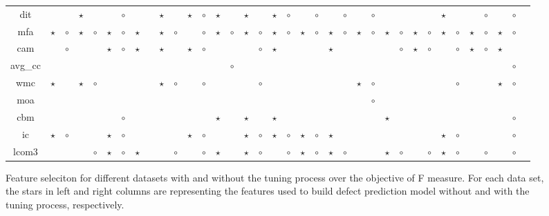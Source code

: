 \documentclass{sig-alternative}
\begin{document}
\begin{figure}[!ht]
\begin{tabular}{c|c c|c c|c c|c c|c c|c c|c c|c c|c c|c c|c c|c c|c c|c c|c c|c c|c c|c }
dit& & & $\star$& & & $\circ$& & & $\star$& & $\star$& $\circ$& $\star$& & $\star$& & $\star$& $\circ$& & $\circ$& & $\circ$& & $\circ$& & & & & $\star$& & & $\circ$& & $\circ$\\
mfa& $\star$& $\circ$& $\star$& $\circ$& $\star$& $\circ$& $\star$& & $\star$& $\circ$& & $\circ$& $\star$& $\circ$& $\star$& $\circ$& $\star$& $\circ$& $\star$& $\circ$& $\star$& $\circ$& $\star$& $\circ$& $\star$& $\circ$& $\star$& $\circ$& $\star$& $\circ$& $\star$& $\circ$& $\star$& $\circ$\\
cam& & $\circ$& & & $\star$& $\circ$& $\star$& & $\star$& & $\star$& $\circ$& & & & $\circ$& $\star$& & & & $\star$& & & & & $\circ$& $\star$& $\circ$& & $\circ$& $\star$& $\circ$& $\star$& \\
avg\_cc& & & & & & & & & & & & & & $\circ$& & & & & & & & & & & & & & & & & & & & $\circ$\\
wmc& $\star$& & $\star$& $\circ$& & & & & $\star$& $\circ$& & $\circ$& & & & $\circ$& & & & & & & $\star$& $\circ$& & & & & & $\circ$& & & $\star$& $\circ$\\
moa& & & & & & & & & & & & & & & & & & & & & & & & $\circ$& & & & & & & & & & \\
cbm& & & & & & $\circ$& & & & & & & $\star$& & $\star$& & $\star$& & & & & & & & $\star$& & & & & & & & & $\circ$\\
ic& $\star$& $\circ$& & & $\star$& $\circ$& & & & & $\star$& $\circ$& & & $\star$& $\circ$& $\star$& $\circ$& $\star$& $\circ$& $\star$& & & & & & & & $\star$& $\circ$& & & & $\circ$\\
lcom3& & & & $\circ$& $\star$& $\circ$& $\star$& & & $\circ$& & $\circ$& $\star$& & $\star$& $\circ$& & $\circ$& $\star$& $\circ$& $\star$& $\circ$& & & $\star$& $\circ$& & $\circ$& $\star$& $\circ$& & $\circ$& & $\circ$\\

  \end{tabular}
    \caption{Feature seleciton for different datasets with and without the tuning process over the objective of F measure. For each data set, the stars in left and right columns are representing the features used to build defect prediction model without and with the tuning process, respectively.}
\end{figure}
\end{document}

